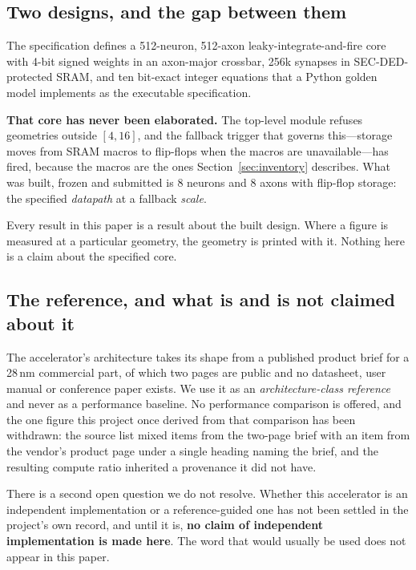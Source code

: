 \documentclass[11pt,a4paper]{article}
\begin{document}
\subsection{Two designs, and the gap between them}

The specification defines a 512-neuron, 512-axon leaky-integrate-and-fire
core with 4-bit signed weights in an axon-major crossbar, \num{256}k
synapses in SEC-DED-protected SRAM, and ten bit-exact integer equations
that a Python golden model implements as the executable specification.

\textbf{That core has never been elaborated.} The top-level module
refuses geometries outside $[4,16]$, and the fallback trigger that
governs this---storage moves from SRAM macros to flip-flops when the
macros are unavailable---has fired, because the macros are the ones
Section~\ref{sec:inventory} describes. What was built, frozen and
submitted is 8 neurons and 8 axons with flip-flop storage: the
specified \emph{datapath} at a fallback \emph{scale}.

Every result in this paper is a result about the built design. Where a
figure is measured at a particular geometry, the geometry is printed with
it. Nothing here is a claim about the specified core.

\subsection{The reference, and what is and is not claimed about it}

The accelerator's architecture takes its shape from a published product
brief for a 28\,nm commercial part, of which two pages are public and no
datasheet, user manual or conference paper exists. We use it as an
\emph{architecture-class reference} and never as a performance baseline.
No performance comparison is offered, and the one figure this project
once derived from that comparison has been withdrawn: the source list
mixed items from the two-page brief with an item from the vendor's
product page under a single heading naming the brief, and the resulting
compute ratio inherited a provenance it did not have.

There is a second open question we do not resolve. Whether this
accelerator is an independent implementation or a reference-guided one
has not been settled in the project's own record, and until it is,
\textbf{no claim of independent implementation is made here}. The word
that would usually be used does not appear in this paper.
\end{document}
